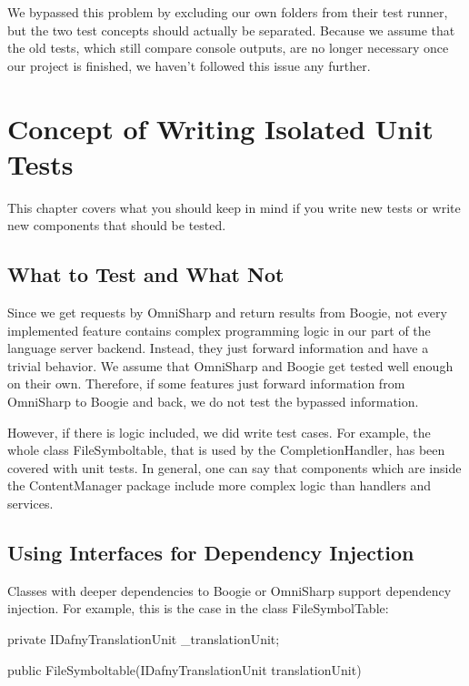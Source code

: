 \documentclass[]{book}
\begin{document}
We bypassed this problem by excluding our own folders from their test runner, but the two test concepts should actually be separated. Because we assume that the old tests, which still compare console outputs, are no longer necessary once our project is finished, we haven't followed this issue any further.

\section{Concept of Writing Isolated Unit Tests}\label{concept-of-writing-isolated-unit-tests}

This chapter covers what you should keep in mind if you write new tests or write new components that should be tested.

\subsection{What to Test and What Not }\label{what-to-test-and-what-not}

Since we get requests by OmniSharp and return results from Boogie, not every implemented feature contains complex programming logic in our part of the language server backend. Instead, they just forward information and have a trivial behavior. We assume that OmniSharp and Boogie get tested well enough on their own. Therefore, if some features just forward information from OmniSharp to Boogie and back, we do not test the bypassed information.

However, if there is logic included, we did write test cases. For example, the whole class FileSymboltable, that is used by the CompletionHandler, has been covered with unit tests. In general, one can say that components which are inside the ContentManager package include more complex logic than handlers and services.

\subsection{Using Interfaces for Dependency Injection }\label{using-interfaces-for-dependency-injection}

Classes with deeper dependencies to Boogie or OmniSharp support dependency injection. For example, this is the case in the class FileSymbolTable:

private IDafnyTranslationUnit \_translationUnit;

public FileSymboltable(IDafnyTranslationUnit translationUnit)
\end{document}
